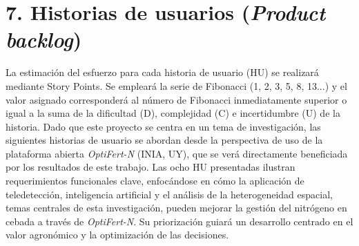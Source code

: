 \documentclass[
11pt, %
]{charter}
\begin{document}
\section{7. Historias de usuarios (\textit{Product backlog})}
\label{sec:backlog}
La estimación del esfuerzo para cada historia de usuario (HU) se realizará mediante Story Points. Se empleará la serie de Fibonacci (1, 2, 3, 5, 8, 13...) y el valor asignado corresponderá al número de Fibonacci inmediatamente superior o igual a la suma de la dificultad (D), complejidad (C) e incertidumbre (U) de la historia. Dado que este proyecto se centra en un tema de investigación, las siguientes historias de usuario se abordan desde la perspectiva de uso de la plataforma abierta \textit{OptiFert-N} (INIA, UY), que se verá directamente beneficiada por los resultados de este trabajo. Las ocho HU presentadas ilustran requerimientos funcionales clave, enfocándose en cómo la aplicación de teledetección, inteligencia artificial y el análisis de la heterogeneidad espacial, temas centrales de esta investigación, pueden mejorar la gestión del nitrógeno en cebada a través de \textit{OptiFert-N}. Su priorización guiará un desarrollo centrado en el valor agronómico y la optimización de las decisiones.
\end{document}
